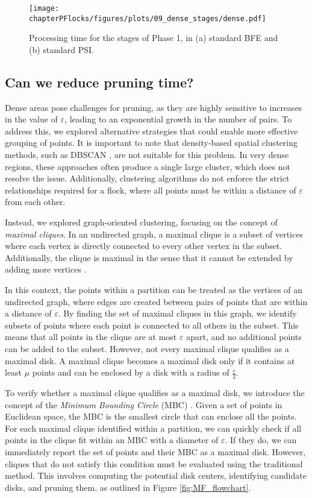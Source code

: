 \begin{figure}
    \centering
    \texttt{[image: chapterPFlocks/figures/plots/09\_dense\_stages/dense.pdf]} 
    \caption{Processing time for the stages of Phase 1, in (a) standard BFE and (b) standard  PSI.}\label{fig:dense_stages}
\end{figure}

\subsection{Can we reduce pruning time?}
Dense areas pose challenges for pruning, as they are highly sensitive to increases in the value of $\varepsilon$, leading to an exponential growth in the number 
of pairs. To address this, we explored alternative strategies that could enable more effective grouping of points. It is important to note that density-based 
spatial clustering methods, such as DBSCAN \cite{dbscan}, are not suitable for this problem. In very dense regions, these approaches often produce a single 
large cluster, which does not resolve the issue. Additionally, clustering algorithms do not enforce the strict relationships required for a flock, where all 
points must be within a distance of $\varepsilon$ from each other.

Instead, we explored graph-oriented clustering, focusing on the concept of \textit{maximal cliques}. In an undirected graph, a maximal clique is a subset of 
vertices where each vertex is directly connected to every other vertex in the subset. Additionally, the clique is maximal in the sense that it cannot be 
extended by adding more vertices \cite{tomita_clique_2013, bron_algorithm_1973}.

In this context, the points within a partition can be treated as the vertices of an undirected graph, where edges are created between pairs of points that are 
within a distance of $\varepsilon$. By finding the set of maximal cliques in this graph, we identify subsets of points where each point is connected to all 
others in the subset. This means that all points in the clique are at most $\varepsilon$ apart, and no additional points can be added to the subset.
However, not every maximal clique qualifies as a maximal disk. A maximal clique becomes a maximal disk only if it contains at least $\mu$ points and can be 
enclosed by a disk with a radius of $\frac{\varepsilon}{2}$.

To verify whether a maximal clique qualifies as a maximal disk, we introduce the concept of the \textit{Minimum Bounding Circle} (MBC) \cite{welzl_mbc_1991}. 
Given a set of points in Euclidean space, the MBC is the smallest circle that can enclose all the points. For each maximal clique identified within a partition, 
we can quickly check if all points in the clique fit within an MBC with a diameter of $\varepsilon$. If they do, we can immediately report the set of points and 
their MBC as a maximal disk.  However, cliques that do not satisfy this condition must be evaluated using the traditional method. This involves computing the 
potential disk centers, identifying candidate disks, and pruning them, as outlined in Figure \ref{fig:MF_flowchart}.

